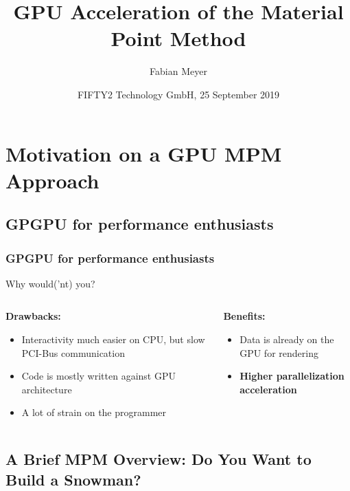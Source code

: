 \documentclass{beamer}
\title{GPU Acceleration of the Material Point Method}
\author %
{Fabian Meyer}
\date{FIFTY2 Technology GmbH, 25 September 2019}
\begin{document}
\begin{frame}
\titlepage
\end{frame}

\section{Motivation on a GPU MPM Approach}
\subsection{GPGPU for performance enthusiasts}
\begin{frame}
\frametitle{GPGPU for performance enthusiasts}
  Why would('nt) you?
  \vfill
  \begin{columns}[T]
    \begin{column}{0.45\textwidth}
      \textbf{Drawbacks:}
    \begin{itemize}
      \item Interactivity much easier on CPU, but slow PCI-Bus communication
      \item Code is mostly written against GPU architecture
      \item A lot of strain on the programmer
    \end{itemize}
    \end{column}
    \begin{column}{0.45\textwidth}
      \textbf{Benefits:}
    \begin{itemize}
      \item Data is already on the GPU for rendering
      \item \textbf{Higher parallelization acceleration}
    \end{itemize}
    \end{column}
  \end{columns}
\end{frame}

\subsection{A Brief MPM Overview: Do You Want to Build a Snowman?}
\end{document}
